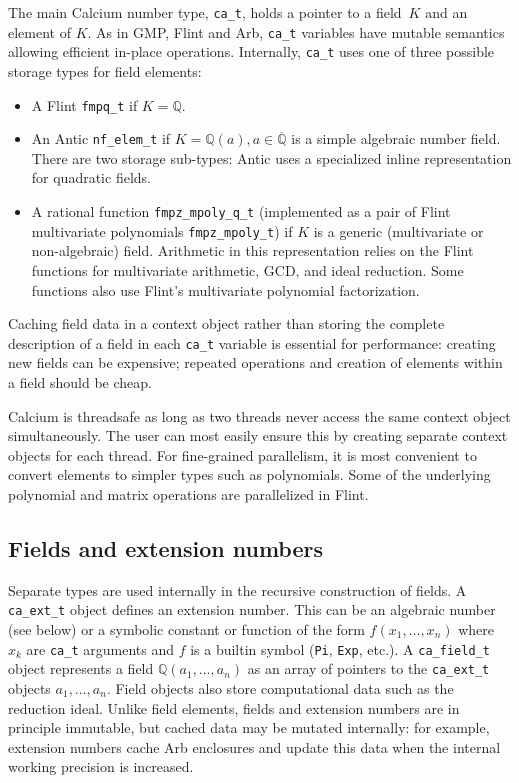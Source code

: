\documentclass[sigconf,screen,urlbreakonhyphens]{acmart}
\begin{document}
The main Calcium number type, \texttt{ca\_t}, holds a pointer
to a field~$K$ and an element of $K$.
As in GMP, Flint and Arb, \texttt{ca\_t} variables have mutable semantics
allowing efficient in-place operations.
Internally, \texttt{ca\_t} uses one of three possible storage types
for field elements:
\begin{itemize}
\item A Flint \texttt{fmpq\_t} if $K = \mathbb{Q}$.
\item An Antic \texttt{nf\_elem\_t} if $K = \mathbb{Q}(a), a \in \overline{\mathbb{Q}}$ is a simple algebraic number field. There are two storage sub-types: Antic uses a specialized inline representation for quadratic fields.
\item A rational function \texttt{fmpz\_mpoly\_q\_t} (implemented as a pair of Flint multivariate polynomials \texttt{fmpz\_mpoly\_t}) if $K$ is a generic (multivariate or non-algebraic) field. Arithmetic in this representation relies on the Flint functions for multivariate arithmetic, GCD, and ideal reduction. Some functions also use Flint's multivariate polynomial factorization.
\end{itemize}

Caching field data in a context object rather than storing the
complete description of a field in each \texttt{ca\_t} variable
is essential for performance: creating new fields can be
expensive; repeated operations and creation of elements within a field
should be cheap.


Calcium is threadsafe as long as two threads never
access the same context object simultaneously. The user can most easily
ensure this by creating separate context objects for each thread.
For fine-grained parallelism, it is most convenient to
convert elements to simpler types such as polynomials.
Some of the underlying polynomial and matrix operations
are parallelized in Flint.


\subsection{Fields and extension numbers}

Separate types are used internally
in the recursive construction of fields.
A \texttt{ca\_ext\_t} object
defines an extension number.
This can be an algebraic number (see below)
or a symbolic constant or function of the form $f(x_1,\ldots,x_n)$
where $x_k$ are \texttt{ca\_t} arguments and $f$ is a builtin
symbol (\texttt{Pi}, \texttt{Exp}, etc.).
A \texttt{ca\_field\_t} object represents a field
$\mathbb{Q}(a_1,\ldots,a_n)$
as an array of pointers to the \texttt{ca\_ext\_t} objects
$a_1,\ldots,a_n$.
Field objects also store computational
data such as the reduction ideal.
Unlike field elements, fields and extension numbers are in principle immutable,
but cached data may be mutated internally: for example, extension numbers
cache Arb enclosures
and update this data when the internal working precision is increased.
\end{document}
